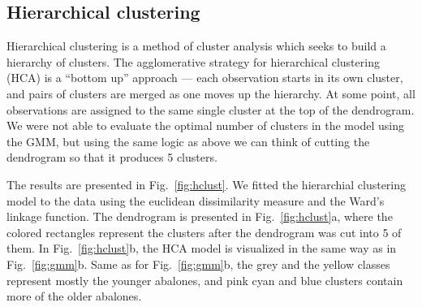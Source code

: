 \documentclass[10pt, paper=a4]{article}
\begin{document}
\subsection{Hierarchical clustering}
Hierarchical clustering is a method of cluster analysis which seeks to build a
hierarchy of clusters.  The agglomerative strategy for hierarchical clustering
(HCA) is a ``bottom up'' approach --- each observation starts in its own
cluster, and pairs of clusters are merged as one moves up the hierarchy.  At
some point, all observations are assigned to the same single cluster at the top
of the dendrogram.  We were not able to evaluate the optimal number of clusters
in the model using the GMM, but using the same logic as above we can think of
cutting the dendrogram so that it produces 5 clusters.

The results are presented in Fig.~\ref{fig:hclust}.  We fitted the hierarchial
clustering model to the data using the euclidean dissimilarity measure and the
Ward's linkage function.  The dendrogram is presented in Fig.~\ref{fig:hclust}a,
where the colored rectangles represent the clusters after the dendrogram was cut
into 5 of them.  In Fig.~\ref{fig:hclust}b, the HCA model is visualized in the
same way as in Fig.~\ref{fig:gmm}b.  Same as for Fig.~\ref{fig:gmm}b, the grey
and the yellow classes represent mostly the younger abalones, and pink cyan and
blue clusters contain more of the older abalones.
\end{document}
